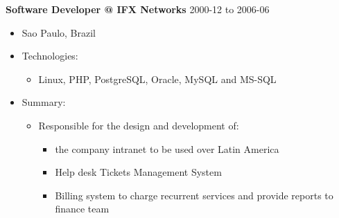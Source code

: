 \documentclass[margin]{res}
\begin{document}
\textbf{Software Developer @ IFX Networks} 2000-12 to 2006-06

\begin{itemize}

\item
  Sao Paulo, Brazil
\item
  Technologies:

  \begin{itemize}
  
  \item
    Linux, PHP, PostgreSQL, Oracle, MySQL and MS-SQL
  \end{itemize}
\item
  Summary:

  \begin{itemize}
  
  \item
    Responsible for the design and development of:

    \begin{itemize}
    
    \item
      the company intranet to be used over Latin America
    \item
      Help desk Tickets Management System
    \item
      Billing system to charge recurrent services and provide reports to
      finance team
    \end{itemize}
  \end{itemize}
\end{itemize}
\end{document}
